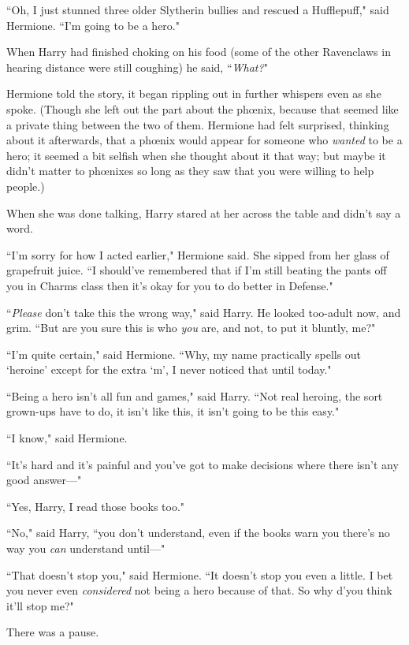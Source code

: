 ``Oh, I just stunned three older Slytherin bullies and rescued a Hufflepuff," said Hermione. ``I'm going to be a hero."

When Harry had finished choking on his food (some of the other Ravenclaws in hearing distance were still coughing) he said, ``\emph{What?}"

Hermione told the story, it began rippling out in further whispers even as she spoke. (Though she left out the part about the phœnix, because that seemed like a private thing between the two of them. Hermione had felt surprised, thinking about it afterwards, that a phœnix would appear for someone who \emph{wanted} to be a hero; it seemed a bit selfish when she thought about it that way; but maybe it didn't matter to phœnixes so long as they saw that you were willing to help people.)

When she was done talking, Harry stared at her across the table and didn't say a word.

``I'm sorry for how I acted earlier," Hermione said. She sipped from her glass of grapefruit juice. ``I should've remembered that if I'm still beating the pants off you in Charms class then it's okay for you to do better in Defense."

``\emph{Please} don't take this the wrong way," said Harry. He looked too-adult now, and grim. ``But are you sure this is who \emph{you} are, and not, to put it bluntly, me?"

``I'm quite certain," said Hermione. ``Why, my name practically spells out `heroine' except for the extra `m', I never noticed that until today."

``Being a hero isn't all fun and games," said Harry. ``Not real heroing, the sort grown-ups have to do, it isn't like this, it isn't going to be this easy."

``I know," said Hermione.

``It's hard and it's painful and you've got to make decisions where there isn't any good answer---"

``Yes, Harry, I read those books too."

``No," said Harry, ``you don't understand, even if the books warn you there's no way you \emph{can} understand until---"

``That doesn't stop you," said Hermione. ``It doesn't stop you even a little. I bet you never even \emph{considered} not being a hero because of that. So why d'you think it'll stop me?"

There was a pause.

